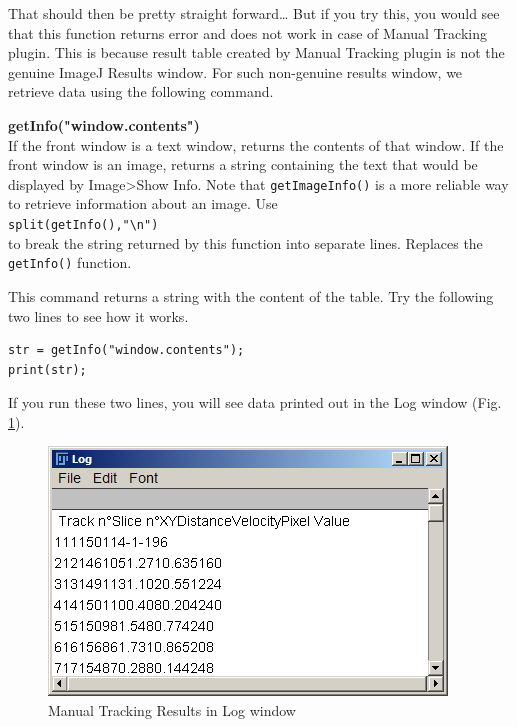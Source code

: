 \documentclass[11pt,a4paper,oneside]{report}
\newenvironment{indentCom}%
{\begin{list}{}%
         {\setlength{\leftmargin}{1em}}%
         \item[]%
}
{\end{list}}
\newcommand{\ilcom}[1]{\texttt{\small#1}}
\begin{document}
That should then be pretty straight forward\ldots 
But if you try this, you would see that this function returns error and 
does not work in case of Manual Tracking plugin. 
This is because result table created by Manual Tracking plugin is not the genuine ImageJ Results window. 
For such non-genuine results window, we retrieve data using the following command. 
\begin{indentCom}
\textbf{getInfo("window.contents")}\\
If the front window is a text window, returns the contents of that window. 
If the front window is an image, returns a string containing the text that would be displayed by 
Image>Show Info. Note that \ilcom{getImageInfo()} is a more reliable way to retrieve information 
about an image. Use \\
\ilcom{split(getInfo(),"\textbackslash{}n")} \\
to break the string returned by this function into separate lines. Replaces the \ilcom{getInfo()} function.
\end{indentCom}

This command returns a string with the content of the table. 
Try the following two lines to see how it works. \\

\begin{lstlisting}[numbers=none, morekeywords={*, getInfo}]
str = getInfo("window.contents");
print(str);
\end{lstlisting}
If you run these two lines, you will see data printed out in the Log window 
(Fig. \ref{fig:manualtrackingresultsLog}). 
\begin{figure}[htbp]
\begin{center}
\includegraphics[scale=0.6]{fig/fig253_AllValuesinLog.png}
\caption{Manual Tracking Results in Log window}
\label{fig:manualtrackingresultsLog}
\end{center}
\end{figure}
\end{document}
